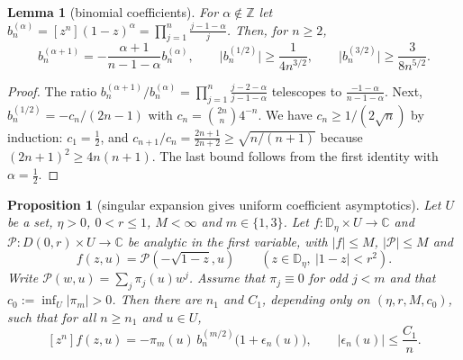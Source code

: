 \documentclass[11pt]{amsart}
\newtheorem{lemma}[theorem]{Lemma}
\newtheorem{proposition}[theorem]{Proposition}
\theoremstyle{definition}
\theoremstyle{remark}
\numberwithin{equation}{section}
\newcommand{\CC}{\mathbb{C}}
\newcommand{\ZZ}{\mathbb{Z}}
\newcommand{\DD}{\mathbb{D}}
\newcommand{\cP}{\mathcal{P}}
\newcommand{\abs}[1]{\lvert #1\rvert}
\begin{document}
\begin{lemma}[binomial coefficients]\label{lem:binom}
For \(\alpha\notin\ZZ\) let \(b_n^{(\alpha)}=[z^n](1-z)^\alpha=\prod_{j=1}^n\frac{j-1-\alpha}{j}\). Then, for \(n\ge2\),
\[
b_n^{(\alpha+1)}=-\frac{\alpha+1}{n-1-\alpha}b_n^{(\alpha)},\qquad\abs{b_n^{(1/2)}}\ge\frac1{4n^{3/2}},\qquad\abs{b_n^{(3/2)}}\ge\frac3{8n^{5/2}}.
\]
\end{lemma}

\begin{proof}
The ratio \(b_n^{(\alpha+1)}/b_n^{(\alpha)}=\prod_{j=1}^n\frac{j-2-\alpha}{j-1-\alpha}\) telescopes to \(\frac{-1-\alpha}{n-1-\alpha}\). Next, \(b_n^{(1/2)}=-c_n/(2n-1)\) with \(c_n=\binom{2n}{n}4^{-n}\). We have \(c_n\ge1/(2\sqrt n)\) by induction: \(c_1=\frac12\), and \(c_{n+1}/c_n=\frac{2n+1}{2n+2}\ge\sqrt{n/(n+1)}\) because \((2n+1)^2\ge4n(n+1)\). The last bound follows from the first identity with \(\alpha=\frac12\).
\end{proof}

\begin{proposition}[singular expansion gives uniform coefficient asymptotics]\label{prop:asym}
Let \(U\) be a set, \(\eta>0\), \(0<r\le1\), \(M<\infty\) and \(m\in\{1,3\}\). Let \(f\colon\DD_\eta\times U\to\CC\) and \(\cP\colon D(0,r)\times U\to\CC\) be analytic in the first variable, with \(\abs{f}\le M\), \(\abs{\cP}\le M\) and
\[
f(z,u)=\cP(-\sqrt{1-z},u)\qquad(z\in\DD_\eta,\ \abs{1-z}<r^2).
\]
Write \(\cP(w,u)=\sum_j\pi_j(u)w^j\). Assume that \(\pi_j\equiv0\) for odd \(j<m\) and that \(c_0:=\inf_U\abs{\pi_m}>0\). Then there are \(n_1\) and \(C_1\), depending only on \((\eta,r,M,c_0)\), such that for all \(n\ge n_1\) and \(u\in U\),
\[
[z^n]f(z,u)=-\pi_m(u)\,b_n^{(m/2)}\bigl(1+\epsilon_n(u)\bigr),\qquad\abs{\epsilon_n(u)}\le\frac{C_1}{n}.
\]
\end{proposition}
\end{document}
